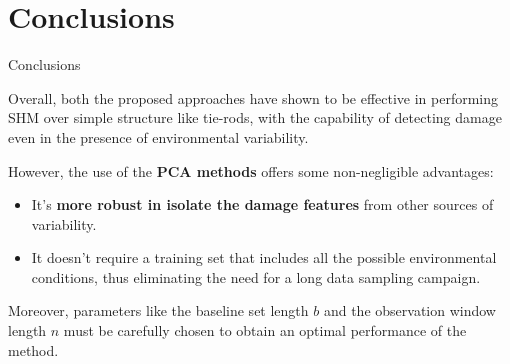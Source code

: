 \section{Conclusions}

\begin{frame}{Conclusions}

    Overall, both the proposed approaches have shown to be effective in performing SHM over simple structure like tie-rods, with the capability of detecting damage even in the presence of environmental variability.

    \vspace{9pt}

    However, the use of the \textbf{PCA methods} offers some non-negligible advantages:

    \begin{itemize}
        \item It's \textbf{more robust in isolate the damage features} from other sources of variability.
        \item It doesn't require a training set that includes all the possible environmental conditions, thus eliminating the need for a long data sampling campaign.
    \end{itemize}

    \vspace{9pt}

    Moreover, parameters like the baseline set length $b$ and the observation window length $n$ must be carefully chosen to obtain an optimal performance of the method.

\end{frame}






